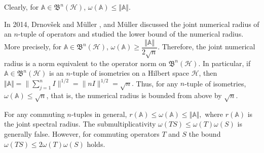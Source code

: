 \documentclass[12pt]{article}
\begin{document}
Clearly, for $\mathbb{A} \in \mathfrak{B}^{n}(\mathcal{H})$,
$   \omega(\mathbb{A}) \leq
    \Vert \mathbb{A} \Vert. $

In 2014, Drnov\v{s}ek and Müller \cite{Drnovsek2014}, and Müller \cite{Muller2014} discussed the joint numerical radius of an $n$-tuple of operators and studied the lower bound of the numerical radius. More precisely, for $\mathbb{A} \in \mathfrak{B}^{n}(\mathcal{H})$,
\(
    \omega(\mathbb{A}) \geq
    \dfrac{\Vert \mathbb{A} \Vert}{2\sqrt{n}}.
\)
Therefore, the joint numerical radius is a norm equivalent to the operator norm on
$\mathfrak{B}^{n}(\mathcal{H})$. In particular, if $ \mathbb{A} \in \mathfrak{B}^{n}(\mathcal{H})$
is an $n$-tuple of isometries on a Hilbert space $\mathcal{H}$, then $ \Vert \mathbb{A} \Vert =  \|\sum\limits_{j=1}^n I \|^{1/2} = \|nI\|^{1/2} = \sqrt{n}. $
Thus, for any $n$-tuple of isometries, $\omega(\mathbb{A}) \leq \sqrt{n}$,
that is, the numerical radius is bounded from above by $\sqrt{n}$.

For any commuting $n$-tuples in general, $r(\mathbb{A})\leq \omega(\mathbb{A}) \leq \Vert \mathbb{A} \Vert,$ where $r(\mathbb{A})$ is the joint spectral radius.
The submultiplicativity  $\omega(TS) \le \omega(T)\omega(S)$ is generally false.
However, for commuting operators $T$ and $S$ the bound $ \omega(TS) \le 2\omega(T)\omega(S) $ holds.
\end{document}
